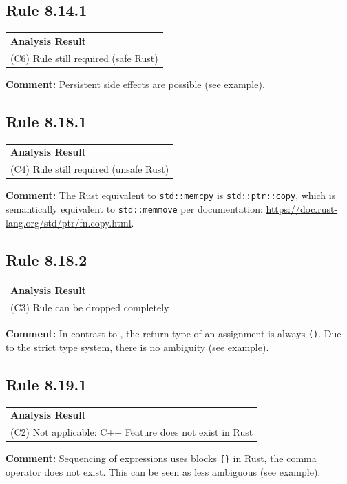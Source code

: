 \subsection*{Rule 8.14.1}
\begin{longtable}{p{13cm}}
\textbf{Analysis Result} \\
(C6) Rule still required (safe Rust) \\
\end{longtable}
\textbf{Comment:} Persistent side effects are possible (see example). \\


\subsection*{Rule 8.18.1}
\begin{longtable}{p{13cm}}
\textbf{Analysis Result} \\
(C4) Rule still required (unsafe Rust) \\
\end{longtable}
\textbf{Comment:} The Rust equivalent to \texttt{std::memcpy} is \texttt{std::ptr::copy}, which is semantically equivalent to \texttt{std::memmove} per documentation: \url{https://doc.rust-lang.org/std/ptr/fn.copy.html}. \\


\subsection*{Rule 8.18.2}
\begin{longtable}{p{13cm}}
\textbf{Analysis Result} \\
(C3) Rule can be dropped completely \\
\end{longtable}
\textbf{Comment:} In contrast to \Cpp, the return type of an assignment is always \texttt{()}. Due to the strict type system, there is no ambiguity (see example). \\


\subsection*{Rule 8.19.1}
\begin{longtable}{p{13cm}}
\textbf{Analysis Result} \\
(C2) Not applicable: C++ Feature does not exist in Rust \\
\end{longtable}
\textbf{Comment:} Sequencing of expressions uses blocks \texttt{\{\}} in Rust, the comma operator does not exist. This can be seen as less ambiguous (see example). \\


